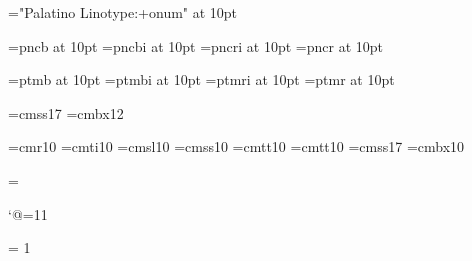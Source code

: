 


\font\palaosf="Palatino Linotype:+onum" at 10pt

\font\twelvebf=pncb at 10pt%
\font\twelvebi=pncbi at 10pt%
\font\twelveit=pncri at 10pt%
\font\twelverm=pncr at 10pt%

\font\twelvebf=ptmb at 10pt%
\font\twelvebi=ptmbi at 10pt%
\font\twelveit=ptmri at 10pt%
\font\twelverm=ptmr at 10pt%

\font\seventeenss=cmss17
\font\twelvebf=cmbx12

\font\twelverm=cmr10
\font\twelveit=cmti10
\font\twelvesl=cmsl10
\font\twelvess=cmss10
\font\twelvett=cmtt10
\font\tentt=cmtt10
\font\seventeenss=cmss17
\font\twelvebf=cmbx10

\emergencystretch 5pt
\hfuzz 0.3pt
\vfuzz=\hfuzz

{\catcode`@=11
\gdef\eplainsetlanguage#1#2#3{%
\expandafter\ifx\csname lang@#1\endcsname \relax
\message{no patterns for #1}%
\else
\global\language = \csname lang@#1\endcsname
\fi

\global\lefthyphenmin = #2\relax
\global\righthyphenmin = #3\relax
}}%

\def\ukenglish{\eplainsetlanguage{ukenglish}{2}{3}}


\twelverm

\parskip 0pt

\pdfpagewidth 129mm
\pdfpageheight 198mm

\hsize 99mm
\vsize 161mm

\voffset -9.4mm
\output{\ifodd\pageno\hoffset -11.4mm\else\hoffset -9.4mm\fi
\plainoutput}

\begingroup
  \nopagenumbers
  
\endgroup

\pageno = 1












\bye 